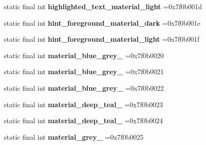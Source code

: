 \begin{DoxyCompactItemize}
static final int {\bfseries highlighted\+\_\+text\+\_\+material\+\_\+light} =0x7f0b001d
\item 
\mbox{\label{classproject4_1_1xaria_1_1R_1_1color_a5c8905bbd612bc9f658c7a58ebf56786}} 
static final int {\bfseries hint\+\_\+foreground\+\_\+material\+\_\+dark} =0x7f0b001e
\item 
\mbox{\label{classproject4_1_1xaria_1_1R_1_1color_a4d98d69c3256893e2f8d5bd75d47b38e}} 
static final int {\bfseries hint\+\_\+foreground\+\_\+material\+\_\+light} =0x7f0b001f
\item 
\mbox{\label{classproject4_1_1xaria_1_1R_1_1color_a7232ab527114198ae9885350bbcc544a}} 
static final int {\bfseries material\+\_\+blue\+\_\+grey\+\_} =0x7f0b0020
\item 
\mbox{\label{classproject4_1_1xaria_1_1R_1_1color_ad817e68bf878f25e64bfd11b89bd2dbd}} 
static final int {\bfseries material\+\_\+blue\+\_\+grey\+\_} =0x7f0b0021
\item 
\mbox{\label{classproject4_1_1xaria_1_1R_1_1color_a5c0d4776bd6418d5717acc889ba4fa96}} 
static final int {\bfseries material\+\_\+blue\+\_\+grey\+\_} =0x7f0b0022
\item 
\mbox{\label{classproject4_1_1xaria_1_1R_1_1color_a756d782882fefbb4d072aceaead4dfcb}} 
static final int {\bfseries material\+\_\+deep\+\_\+teal\+\_} =0x7f0b0023
\item 
\mbox{\label{classproject4_1_1xaria_1_1R_1_1color_a5fb0176fd215ef714a08aa19bd8801fd}} 
static final int {\bfseries material\+\_\+deep\+\_\+teal\+\_} =0x7f0b0024
\item 
\mbox{\label{classproject4_1_1xaria_1_1R_1_1color_ac2645bbc80ac34b553c0f795bfecb3ba}} 
static final int {\bfseries material\+\_\+grey\+\_} =0x7f0b0025
\item 
\mbox{\label{classproject4_1_1xaria_1_1R_1_1color_a962bbacd8d4bc6590ba51093df4cc68d}} 

\end{DoxyCompactItemize}
